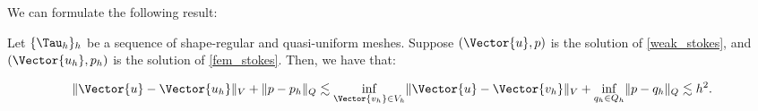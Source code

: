 We can formulate the following result:

\begin{proposition}
    Let $\{\Tau_h\}_h$ be a sequence of shape-regular and quasi-uniform meshes. Suppose $(\Vector{u}, p)$ is the solution of \eqref{weak_stokes}, and $(\Vector{u_h}, p_h)$ is the solution of \eqref{fem_stokes}. Then, we have that:

    \begin{gather}
        \lVert \Vector{u} - \Vector{u_h} \rVert_V + \lVert p - p_h \rVert_Q \lesssim \inf_{\Vector{v_h} \in V_h} \lVert \Vector{u} - \Vector{v_h} \rVert_V + \inf_{q_h \in Q_h} \lVert p - q_h \rVert_Q \lesssim h^2.
    \end{gather}
\end{proposition}